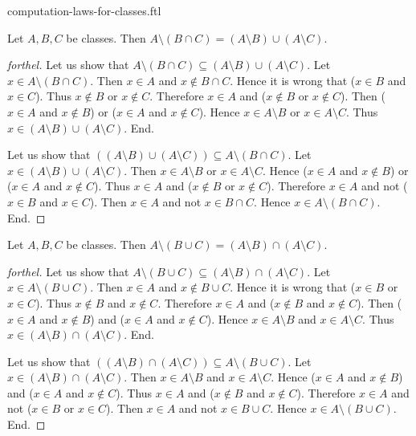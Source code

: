 \documentclass{naproche-library}
\begin{document}
\begin{smodule}{computation-laws-for-classes.ftl}
  \begin{proposition}[forthel,id=FOUNDATIONS_02_5296031436636160]
    Let $A, B, C$ be classes.
    Then $A \setminus (B \cap C) = (A \setminus B) \cup (A \setminus C)$.
  \end{proposition}
  \begin{proof}[forthel]
    Let us show that $A \setminus (B \cap C) \subseteq (A \setminus B) \cup (A \setminus C)$.
      Let $x \in A \setminus (B \cap C)$.
      Then $x \in A$ and $x \notin B \cap C$.
      Hence it is wrong that ($x \in B$ and $x \in C$).
      Thus $x \notin B$ or $x \notin C$.
      Therefore $x \in A$ and ($x \notin B$ or $x \notin C$).
      Then ($x \in A$ and $x \notin B$) or ($x \in A$ and $x \notin C$).
      Hence $x \in A \setminus B$ or $x \in A \setminus C$.
      Thus $x \in (A \setminus B) \cup (A \setminus C)$.
    End.

    Let us show that $((A \setminus B) \cup (A \setminus C)) \subseteq A \setminus (B \cap C)$. %
      Let $x \in (A \setminus B) \cup (A \setminus C)$.
      Then $x \in A \setminus B$ or $x \in A \setminus C$.
      Hence ($x \in A$ and $x \notin B$) or ($x \in A$ and $x \notin C$).
      Thus $x \in A$ and ($x \notin B$ or $x \notin C$).
      Therefore $x \in A$ and not ($x \in B$ and $x \in C$).
      Then $x \in A$ and not $x \in B \cap C$.
      Hence $x \in A \setminus (B \cap C)$.
    End.
  \end{proof}

  \begin{proposition}[forthel,id=FOUNDATIONS_02_2909554153095168]
    Let $A, B, C$ be classes.
    Then $A \setminus (B \cup C) = (A \setminus B) \cap (A \setminus C)$.
  \end{proposition}
  \begin{proof}[forthel]
    Let us show that $A \setminus (B \cup C) \subseteq (A \setminus B) \cap (A \setminus C)$.
      Let $x \in A \setminus (B \cup C)$.
      Then $x \in A$ and $x \notin B \cup C$.
      Hence it is wrong that ($x \in B$ or $x \in C$).
      Thus $x \notin B$ and $x \notin C$.
      Therefore $x \in A$ and ($x \notin B$ and $x \notin C$).
      Then ($x \in A$ and $x \notin B$) and ($x \in A$ and $x \notin C$).
      Hence $x \in A \setminus B$ and $x \in A \setminus C$.
      Thus $x \in (A \setminus B) \cap (A \setminus C)$.
    End.

    Let us show that $((A \setminus B) \cap (A \setminus C)) \subseteq A \setminus (B \cup C)$. %
      Let $x \in (A \setminus B) \cap (A \setminus C)$.
      Then $x \in A \setminus B$ and $x \in A \setminus C$.
      Hence ($x \in A$ and $x \notin B$) and ($x \in A$ and $x \notin C$).
      Thus $x \in A$ and ($x \notin B$ and $x \notin C$).
      Therefore $x \in A$ and not ($x \in B$ or $x \in C$).
      Then $x \in A$ and not $x \in B \cup C$.
      Hence $x \in A \setminus (B \cup C)$.
    End.
  \end{proof}



\end{smodule}
\end{document}
